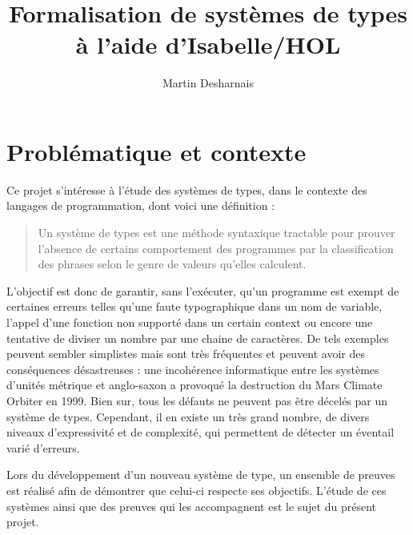\documentclass[a4paper, oneside, 12pt, titlepage, draft]{article}
\begin{document}
\title{Formalisation de systèmes de types à l'aide d'Isabelle/HOL}
\author{Martin Desharnais}
\maketitle

\tableofcontents

\cleardoublepage

\section{Problématique et contexte}


Ce projet s'intéresse à l'étude des systèmes de types, dans le contexte des langages de
programmation, dont voici une définition :

\begin{quotation} %
  Un système de types est une méthode syntaxique tractable pour prouver l'absence de certains
  comportement des programmes par la classification des phrases selon le genre de valeurs qu'elles
  calculent.
\end{quotation}

L'objectif est donc de garantir, sans l'exécuter, qu'un programme est exempt de certaines erreurs
telles qu'une faute typographique dans un nom de variable, l'appel d'une fonction non supporté dans
un certain context ou encore une tentative de diviser un nombre par une chaine de caractères. De
tels exemples peuvent sembler simplistes mais sont très fréquentes et peuvent avoir des conséquences
désastreuses : une incohérence informatique entre les systèmes d'unités métrique et anglo-saxon a
provoqué la destruction du Mars Climate Orbiter en 1999. Bien sur, tous les défauts ne peuvent pas
être décelés par un système de types. Cependant, il en existe un très grand nombre, de divers
niveaux d'expressivité et de complexité, qui permettent de détecter un éventail varié d'erreurs.

Lors du développement d'un nouveau système de type, un ensemble de preuves est réalisé afin de
démontrer que celui-ci respecte ses objectifs. L'étude de ces systèmes ainsi que des
preuves qui les accompagnent est le sujet du présent projet.
\end{document}
